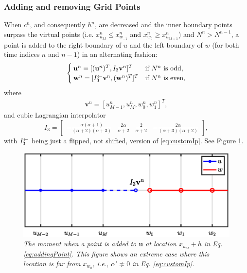 \subsubsection{Adding and removing Grid Points}\label{sec:addRemove}
When $c^n$, and consequently $h^n$, are decreased and the inner boundary points surpass the virtual points (i.e. $x_{u_M}^n \leq x_{w_{-1}}^n$ and $x_{w_0}^n \geq x_{u_{M+1}}^n$) and $N^n >  N^{n-1}$, a point is added to the right boundary of $u$ and the left boundary of $w$ (for both time indices $n$ and $n-1$) in an alternating fashion: 
\begin{equation}\label{eq:addingPoint}
        \begin{cases}\mathbf{u}^n = [(\mathbf{u}^n)^T, I_3\mathbf{v}^n]^T & \text{if $N^n $ is odd},\\
        \mathbf{w}^n = [I_3^\leftarrow\mathbf{v}^n, (\mathbf{w}^n)^T]^T & \text{if $ N^n$ is even},
        \end{cases}
\end{equation}
where 
\begin{align*}
\mathbf{v}^n = [u_{M-1}^n, u_M^n, w_0^n, w_1^n]^T,%
\end{align*}
and cubic Lagrangian interpolator
\begin{equation}\label{eq:customIp}
    I_3 = \begin{bmatrix} -\frac{\alpha(\alpha+1)}{(\alpha+2)(\alpha+3)} &\frac{2\alpha}{\alpha+2} &\frac{2}{\alpha+2} 
    &-\frac{2\alpha}{(\alpha+3)(\alpha+2)}
    \end{bmatrix},
\end{equation}
with $I_3^\leftarrow$ being just a flipped, not shifted, version of \eqref{eq:customIp}.
See Figure \ref{fig:addingPoint}.
%
\begin{figure}[ht]
    \centering
\includegraphics[width=\figwidth\columnwidth]{Figures/addingGridPoint4.eps}
\caption{\label{fig:addingPoint}{\it The moment when a point is added to $\mathbf{u}$ at location $x_{u_M} + h$ in Eq. \eqref{eq:addingPoint}. This figure shows an extreme case where this location is far from $x_{w_0}$, i.e., $\alpha' \not\approx 0$ in Eq. \eqref{eq:customIp}.}}
\end{figure}

